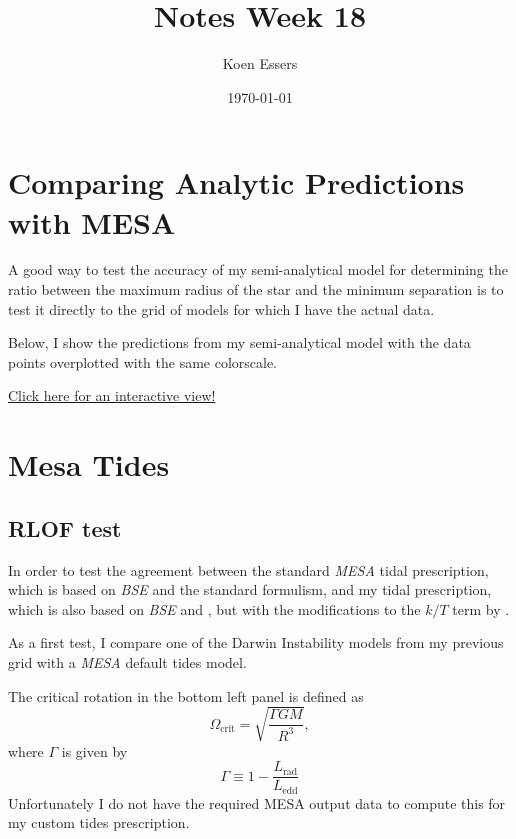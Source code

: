 \documentclass[a4paper,10pt]{article}
\title{Notes Week 18}
\author{Koen Essers}
\date{\today}
\begin{document}
\setuplayout

\section{Comparing Analytic Predictions with MESA}

A good way to test the accuracy of my semi-analytical model for determining the ratio between the maximum radius of the star and the minimum separation is to test it directly to the grid of models for which I have the actual data.

Below, I show the predictions from my semi-analytical model with the data points overplotted with the same colorscale.

\begin{figure}[ht]
    \centering
\end{figure}

\href{https://s-koen.github.io/figures/#/plots/master-internship/w18/fit-surface-low}{Click here for an interactive view!}

\section{Mesa Tides}

\subsection{RLOF test}
In order to test the agreement between the standard \emph{MESA} tidal prescription, which is based on \emph{BSE} and the standard \citet{hut1981} formulism, and my tidal prescription, which is also based on \emph{BSE} and \citet{hut1981}, but with the modifications to the \(k / T\) term by \citet{preece2022}.

As a first test, I compare one of the Darwin Instability models from my previous grid with a \emph{MESA} default tides model.

\begin{figure}[ht]
    \centering
\end{figure}

The critical rotation in the bottom left panel is defined as
\begin{equation*}
    \Omega_\text{crit} = \sqrt{\frac{\Gamma G M}{R^{3}}},
\end{equation*}
where \(\Gamma \) is given by
\begin{equation*}
    \Gamma \equiv  1 - \frac{L_\text{rad}}{L_\text{edd}}
\end{equation*}
Unfortunately I do not have the required MESA output data to compute this for my custom tides prescription.
\end{document}
